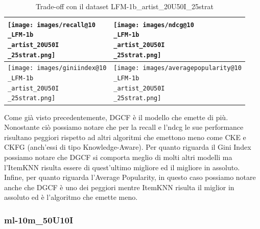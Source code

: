\begin{table}[H]
    \centering
    \footnotesize
    \setlength\tabcolsep{0pt}
    \begin{tabularx}{\textwidth}{|X|X|}
        \hline
        \texttt{[image: images/recall@10\\\_LFM-1b\\\_artist\_20U50I\\\_25strat.png]} &
        \texttt{[image: images/ndcg@10\\\_LFM-1b\\\_artist\_20U50I\\\_25strat.png]} \\
        \hline
        \texttt{[image: images/giniindex@10\\\_LFM-1b\\\_artist\_20U50I\\\_25strat.png]} &
        \texttt{[image: images/averagepopularity@10\\\_LFM-1b\\\_artist\_20U50I\\\_25strat.png]} \\
        \hline
    \end{tabularx}
    \caption{Trade-off con il dataset LFM-1b\_artist\_20U50I\_25strat}
    \label{tab:emissions_info}
\end{table}


\noindent Come già visto precedentemente, DGCF è il modello che emette di più. Nonostante ciò possiamo notare che per la recall e l'ndcg le sue performance risultano peggiori rispetto ad altri algoritmi che emettono meno come CKE e CKFG (anch'essi di tipo Knowledge-Aware).
Per quanto riguarda il Gini Index possiamo notare che DGCF si comporta meglio di molti altri modelli ma l'ItemKNN risulta essere di quest'ultimo migliore ed il migliore in assoluto.
Infine, per quanto riguarda l'Average Popularity, in questo caso possiamo notare anche che DGCF è uno dei peggiori mentre ItemKNN risulta il miglior in assoluto ed è l'algoritmo che emette meno.


\subsubsection{ml-10m\_50U10I}


